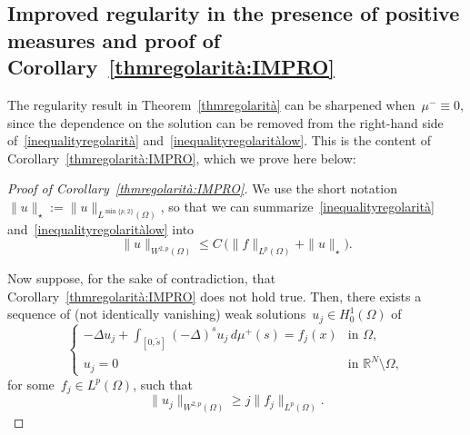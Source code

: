 \documentclass[12pt,a4paper,intlimits,sumlimits]{amsart}
\def \R {\mathbb{R}}
\theoremstyle{definition}
\theoremstyle{plain}
\numberwithin{equation}{section}
\renewcommand{\leq}{\leqslant}
\renewcommand{\ge}{\geqslant}
\begin{document}
\begin{appendix}

\section{Improved regularity in the presence of positive measures and proof of 
Corollary~\ref{thmregolarità:IMPRO}}\label{thmregolarità:IMPRO:APP}

The regularity result in Theorem~\ref{thmregolarità} can be sharpened when~$\mu^-\equiv0$,
since the dependence on the solution can be removed from the right-hand side of~\eqref{inequalityregolarità}
and~\eqref{inequalityregolaritàlow}. This is the content of
Corollary~\ref{thmregolarità:IMPRO}, which we prove here below:

\begin{proof}[Proof of Corollary~\ref{thmregolarità:IMPRO}]
We use the short notation~$ \|u\|_\star:=\|u\|_{L^{\min\{p,2\}}(\Omega)}$,
so that we can summarize~\eqref{inequalityregolarità} and~\eqref{inequalityregolaritàlow}
into
\begin{equation}\label{SUMMA}
\|u\|_{W^{2,p}(\Omega)}\leq 
C\,\Big( \|f\|_{L^p(\Omega)}+\|u\|_\star\Big).
\end{equation}

Now suppose, for the sake of contradiction, that Corollary~\ref{thmregolarità:IMPRO} does not hold true.
Then, there exists a sequence of (not identically vanishing) weak solutions~$u_j\in H^1_0(\Omega)$ of
\begin{equation*}
\begin{cases}
-\Delta u_j +\displaystyle\int_{[0,\widetilde s]}(-\Delta)^s u_j\,d\mu^+(s)
=f_j(x) & \mbox{in } \Omega,
\\
u_j=0  & \mbox{in } \R^N\setminus \Omega,
\end{cases}
\end{equation*}
for some~$f_j\in L^p(\Omega)$, such that\begin{equation}\label{l6bwgc90htfc9324rm:A}
\|u_j\|_{W^{2,p}(\Omega)}\ge
j\|f_j\|_{L^p(\Omega)}.\end{equation}


\end{proof}
\end{appendix}
\end{document}
